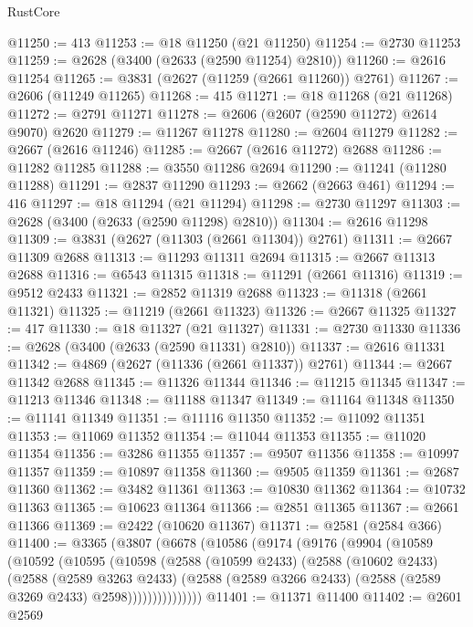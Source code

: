 \begin{lexlean}{RustCore}
\begin{coremodule}
@11250 := 413
@11253 := @18 @11250 (@21 @11250)
@11254 := @2730 @11253
@11259 := @2628 (@3400 (@2633 (@2590 @11254) @2810))
@11260 := @2616 @11254
@11265 := @3831 (@2627 (@11259 (@2661 @11260)) @2761)
@11267 := @2606 (@11249 @11265)
@11268 := 415
@11271 := @18 @11268 (@21 @11268)
@11272 := @2791 @11271
@11278 := @2606 (@2607 (@2590 @11272) @2614 @9070) @2620
@11279 := @11267 @11278
@11280 := @2604 @11279
@11282 := @2667 (@2616 @11246)
@11285 := @2667 (@2616 @11272) @2688
@11286 := @11282 @11285
@11288 := @3550 @11286 @2694
@11290 := @11241 (@11280 @11288)
@11291 := @2837 @11290
@11293 := @2662 (@2663 @461)
@11294 := 416
@11297 := @18 @11294 (@21 @11294)
@11298 := @2730 @11297
@11303 := @2628 (@3400 (@2633 (@2590 @11298) @2810))
@11304 := @2616 @11298
@11309 := @3831 (@2627 (@11303 (@2661 @11304)) @2761)
@11311 := @2667 @11309 @2688
@11313 := @11293 @11311 @2694
@11315 := @2667 @11313 @2688
@11316 := @6543 @11315
@11318 := @11291 (@2661 @11316)
@11319 := @9512 @2433
@11321 := @2852 @11319 @2688
@11323 := @11318 (@2661 @11321)
@11325 := @11219 (@2661 @11323)
@11326 := @2667 @11325
@11327 := 417
@11330 := @18 @11327 (@21 @11327)
@11331 := @2730 @11330
@11336 := @2628 (@3400 (@2633 (@2590 @11331) @2810))
@11337 := @2616 @11331
@11342 := @4869 (@2627 (@11336 (@2661 @11337)) @2761)
@11344 := @2667 @11342 @2688
@11345 := @11326 @11344
@11346 := @11215 @11345
@11347 := @11213 @11346
@11348 := @11188 @11347
@11349 := @11164 @11348
@11350 := @11141 @11349
@11351 := @11116 @11350
@11352 := @11092 @11351
@11353 := @11069 @11352
@11354 := @11044 @11353
@11355 := @11020 @11354
@11356 := @3286 @11355
@11357 := @9507 @11356
@11358 := @10997 @11357
@11359 := @10897 @11358
@11360 := @9505 @11359
@11361 := @2687 @11360
@11362 := @3482 @11361
@11363 := @10830 @11362
@11364 := @10732 @11363
@11365 := @10623 @11364
@11366 := @2851 @11365
@11367 := @2661 @11366
@11369 := @2422 (@10620 @11367)
@11371 := @2581 (@2584 @366)
@11400 := @3365
    (@3807
      (@6678
        (@10586
          (@9174
            (@9176
              (@9904
                (@10589
                  (@10592
                    (@10595
                      (@10598
                        (@2588
                          (@10599 @2433)
                          (@2588
                            (@10602 @2433)
                            (@2588
                              (@2589 @3263 @2433)
                              (@2588
                                (@2589 @3266 @2433)
                                (@2588 (@2589 @3269 @2433) @2598)))))))))))))))
@11401 := @11371 @11400
@11402 := @2601 @2569

\end{coremodule}
\end{lexlean}
